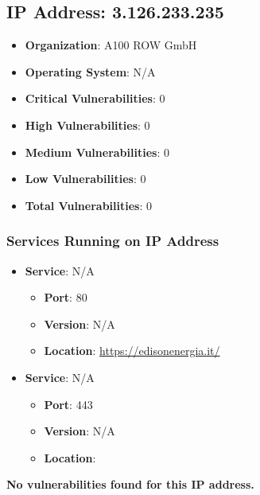 \documentclass{article}
\begin{document}
\clearpage



\subsection{IP Address: 3.126.233.235}

\begin{itemize}
    \item \textbf{Organization}: A100 ROW GmbH
    \item \textbf{Operating System}:  N/A 
    \item \textbf{Critical Vulnerabilities}: 0
    \item \textbf{High Vulnerabilities}: 0
    \item \textbf{Medium Vulnerabilities}: 0
    \item \textbf{Low Vulnerabilities}: 0
    \item \textbf{Total Vulnerabilities}: 0
\end{itemize}

\subsubsection*{Services Running on IP Address}

\begin{itemize}
    
        \item \textbf{Service}: N/A
        \begin{itemize}
            \item \textbf{Port}: 80
            \item \textbf{Version}:  N/A 
            \item \textbf{Location}: \href{ https://edisonenergia.it/ }{ https://edisonenergia.it/ }
        \end{itemize}
    
        \item \textbf{Service}: N/A
        \begin{itemize}
            \item \textbf{Port}: 443
            \item \textbf{Version}:  N/A 
            \item \textbf{Location}: \href{  }{  }
        \end{itemize}
    
\end{itemize}


\textbf{No vulnerabilities found for this IP address.}
\end{document}
